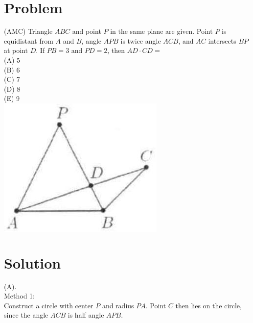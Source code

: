 \documentclass{article}
\begin{document}
\section*{Problem}
(AMC) Triangle \(A B C\) and point \(P\) in the same plane are given. Point \(P\) is equidistant from \(A\) and \(B\), angle \(A P B\) is twice angle \(A C B\), and \(A C\) intersects \(B P\) at point \(D\). If \(P B=3\) and \(P D=2\), then \(A D \cdot C D=\)\\
(A) 5\\
(B) 6\\
(C) 7\\
(D) 8\\
(E) 9\\
\centering
\includegraphics[width=\textwidth]{images/207(2).jpg}

\section*{Solution}
(A).\\
Method 1:\\
Construct a circle with center \(P\) and radius \(P A\). Point \(C\) then lies on the circle, since the angle \(A C B\) is half angle \(A P B\).
\end{document}
